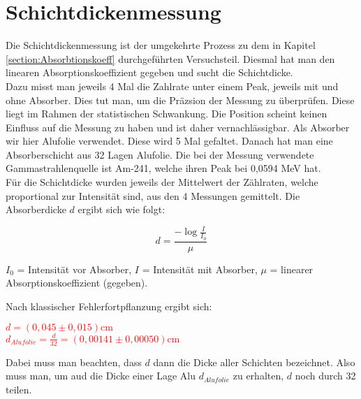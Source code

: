 \section{Schichtdickenmessung}

Die Schichtdickenmessung ist der umgekehrte Prozess zu dem in Kapitel \ref{section:Absorbtionskoeff} durchgeführten Versuchsteil. Diesmal hat man den linearen Absorptionskoeffizient gegeben und 
sucht die Schichtdicke.\\
Dazu misst man jeweils 4 Mal die Zahlrate unter einem Peak, jeweils mit und ohne Absorber. Dies tut man, um die Präzsion der Messung zu überprüfen. Diese liegt im Rahmen der 
statistischen Schwankung. Die Position scheint keinen Einfluss auf die Messung zu haben und ist daher vernachlässigbar. Als Absorber wir hier Alufolie verwendet. Diese wird 
5 Mal gefaltet. Danach hat man eine Absorberschicht aus 32 Lagen Alufolie. Die bei der Messung verwendete Gammastrahlenquelle ist Am-241, welche ihren Peak bei 0,0594 MeV hat. \\

Für die Schichtdicke wurden jeweils der Mittelwert der Zählraten, welche proportional zur Intensität sind, aus den 4 Messungen gemittelt. Die Absorberdicke $d$ ergibt sich wie folgt:

\begin{equation}
    d = \frac{-\log{\frac{I}{I_0}}}{\mu}
\end{equation}

$I_0$ = Intensität vor Absorber, $I$ = Intensität mit Absorber, $\mu$ = linearer Absorptionskoeffizient (gegeben).
\newpage

Nach klassischer Fehlerfortpflanzung ergibt sich:

\begin{center}
    \centering
    \textcolor{red}{$ d = (0,045\pm0,015) \mathrm{cm}$}\\
    \textcolor{red}{$ d_{Alufolie} = \frac{d}{32} = (0,00141\pm0,00050) \mathrm{cm}$}\\
\end{center}

Dabei muss man beachten, dass $d$ dann die Dicke aller Schichten bezeichnet. Also muss man, um aud die Dicke einer Lage Alu $d_{Alufolie}$ zu erhalten, 
$d$ noch durch 32 teilen.